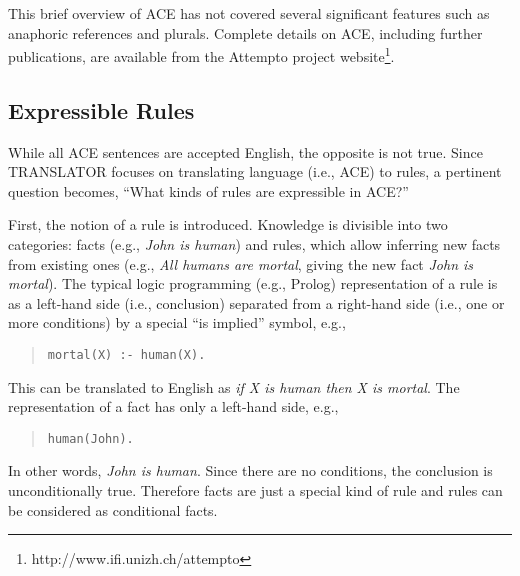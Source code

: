 \documentclass[12pt]{article}
\begin{document}
This brief overview of ACE has not covered several significant features such as anaphoric references and plurals. Complete details on ACE, including further publications, are available from the Attempto project website\footnote{http://www.ifi.unizh.ch/attempto}.

\subsection{Expressible Rules}
While all ACE sentences are accepted English, the opposite is not true. Since TRANSLATOR focuses on translating language (i.e., ACE) to rules, a pertinent question becomes, ``What kinds of rules are expressible in ACE?''

First, the notion of a rule is introduced. Knowledge is divisible into two categories: facts (e.g., \textit{John is human}) and rules, which allow inferring new facts from existing ones (e.g., \textit{All humans are mortal}, giving the new fact \textit{John is mortal}). The typical logic programming (e.g., Prolog) representation of a rule is as a left-hand side (i.e., conclusion) separated from a right-hand side (i.e., one or more conditions) by a special ``is implied'' symbol, e.g.,
\begin{quote}
\texttt{mortal(X) :- human(X).}
\end{quote}
This can be translated to English as \textit{if X is human then X is mortal}. The representation of a fact has only a left-hand side, e.g.,
\begin{quote}
\texttt{human(John).}
\end{quote}
In other words, \textit{John is human}. Since there are no conditions, the conclusion is unconditionally true. Therefore facts are just a special kind of rule and rules can be considered as conditional facts.
\end{document}
